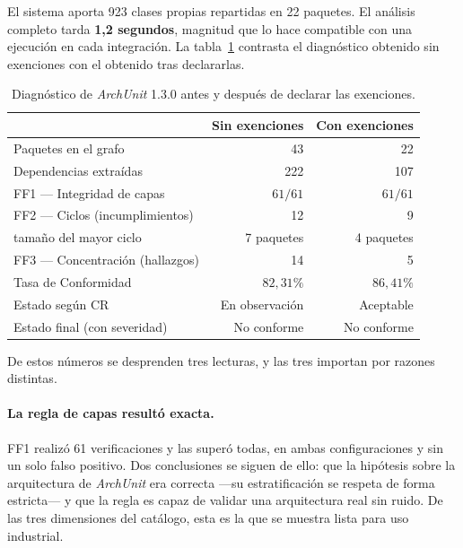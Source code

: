 El sistema aporta 923 clases propias repartidas en 22 paquetes. El análisis completo tarda \textbf{1,2 segundos}, magnitud que lo hace compatible con una ejecución en cada integración. La tabla~\ref{tab:archunit} contrasta el diagnóstico obtenido sin exenciones con el obtenido tras declararlas.

\begin{table}[H]
\centering
\caption{Diagnóstico de \textit{ArchUnit} 1.3.0 antes y después de declarar las exenciones.}
\label{tab:archunit}
\small
\begin{tabular}{lrr}
\toprule
& \textbf{Sin exenciones} & \textbf{Con exenciones} \\
\midrule
Paquetes en el grafo              & 43 & 22 \\
Dependencias extraídas            & 222 & 107 \\
\midrule
FF1 — Integridad de capas         & $61/61$ & $61/61$ \\
FF2 — Ciclos (incumplimientos)    & 12 & 9 \\
\quad tamaño del mayor ciclo      & 7 paquetes & 4 paquetes \\
FF3 — Concentración (hallazgos)   & 14 & 5 \\
\midrule
Tasa de Conformidad               & $82{,}31\%$ & $86{,}41\%$ \\
Estado según CR                   & En observación & Aceptable \\
Estado final (con severidad)      & No conforme & No conforme \\
\bottomrule
\end{tabular}
\end{table}

De estos números se desprenden tres lecturas, y las tres importan por razones distintas.

\paragraph{La regla de capas resultó exacta.} FF1 realizó 61 verificaciones y las superó todas, en ambas configuraciones y sin un solo falso positivo. Dos conclusiones se siguen de ello: que la hipótesis sobre la arquitectura de \textit{ArchUnit} era correcta ---su estratificación se respeta de forma estricta--- y que la regla es capaz de validar una arquitectura real sin ruido. De las tres dimensiones del catálogo, esta es la que se muestra lista para uso industrial.

